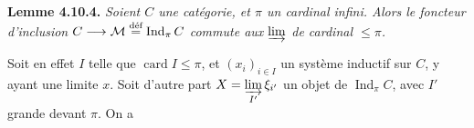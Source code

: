\documentclass[11pt]{article}
\newcommand{\Ind}{\operatorname{Ind}}
\newcommand{\card}{\operatorname{card}}
\begin{document}
\textbf{Lemme 4.10.4.} \textit{Soient $C$ une catégorie, et $\pi$ un cardinal infini. Alors le foncteur d'inclusion $C \longrightarrow \mathcal{M} \overset{\textup{déf}}{=} \Ind_\pi C$ commute aux $\varinjlim$ de cardinal $\leqslant \pi$.}

Soit en effet $I$ telle que $\card I \leqslant \pi$, et $(x_i)_{i\in I}$ un système inductif sur $C$, y ayant une limite $x$. Soit d'autre part $X = \varinjlim\limits_{I'} \xi_{i'}$ un objet de $\Ind_\pi C$, avec $I'$ grande devant $\pi$. On a
\end{document}
